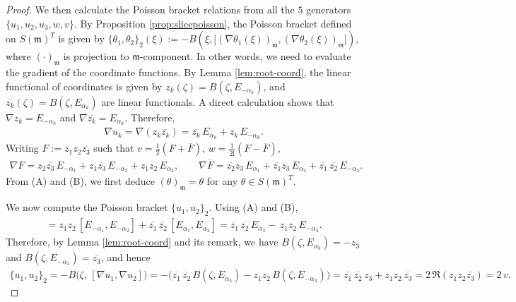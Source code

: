 \documentclass[11pt]{amsart}
\theoremstyle{definition}
\theoremstyle{plain}
\theoremstyle{conclusion}
\begin{document}
\begin{proof}
 
   We then calculate the Poisson bracket relations from all the $5$ generators $\{u_1,u_2,u_3,w,v\}$. By Proposition \ref{prop:slicepoisson}, the Poisson bracket defined on $S(\mathfrak{m})^T$ is given by $\{\theta_1,\theta_2\}_2(\xi) :=-B \left(\xi,\bigl[(\nabla\theta_1(\xi))_{\mathfrak{m}},(\nabla\theta_2(\xi))_{\mathfrak{m}}\bigr]\right)$, where $(\cdot)_\mathfrak{m}$ is projection to $\mathfrak{m}$-component. In other words, we need to evaluate the gradient of the coordinate functions. By Lemma \ref{lem:root-coord}, the linear functional of coordinates is given by $z_k(\zeta)=B(\zeta,E_{-\alpha_k})$, and $\overline{z_k}(\zeta)=B(\zeta,E_{\alpha_k})$ are linear functionals. A direct calculation shows that  $\nabla z_k=E_{-\alpha_k}$ and $\nabla \overline{z_k}=E_{\alpha_k}$. Therefore, \begin{align}
\nabla u_k=\nabla(z_k\overline{z_k})=\overline{z_k}\,E_{\alpha_k}+z_k\,E_{-\alpha_k}.\tag{A}
\end{align} Writing $F:=z_1z_2\overline{z_3}$ such that $v=\frac{1}{2}(F+\overline{F})$, $w=\frac{1}{2\mathrm{i}}(F-\overline{F})$, \begin{align}
\nabla F=z_2\overline{z_3}\,E_{-\alpha_1}+z_1\overline{z_3}\,E_{-\alpha_2}+z_1z_2\,E_{\alpha_3},\qquad \nabla\overline{F}=\overline{z_2}z_3\,E_{\alpha_1}+\overline{z_1}z_3\,E_{\alpha_2}+\overline{z_1}\,\overline{z_2}\,E_{-\alpha_3}.\tag{B}
\end{align} From (A) and (B), we first deduce $(\theta)_\mathfrak{m} =\theta$ for any $\theta \in S(\mathfrak{m})^T$.

We now compute the Poisson bracket $\{u_1,u_2\}_2$.  Using (A) and (B), \begin{align*}
[\nabla u_1,\nabla u_2] = z_1z_2\,[E_{-\alpha_1},E_{-\alpha_2}]+\overline{z_1}\,\overline{z_2}\,[E_{\alpha_1},E_{\alpha_2}] =  \overline{z_1}\,\overline{z_2}\,E_{\alpha_3}-\,z_1z_2\,E_{-\alpha_3}.
\end{align*} Therefore, by Lemma \ref{lem:root-coord} and its remark, we have $B(\zeta,E_{\alpha_3}) = -z_3$ and $B(\zeta,E_{-\alpha_3}) = \overline{z_3}$, and hence \begin{align*}
\{u_1,u_2\}_2 =-B\big(\zeta,\,[\nabla u_1,\nabla u_2]\big) = -\Big( \overline{z_1}\,\overline{z_2}\,B(\zeta,E_{\alpha_3}) -z_1z_2\,B(\zeta,E_{-\alpha_3})\Big) = \overline{z_1}\,\overline{z_2}\,z_3 +z_1z_2\,\overline{z_3} = 2\,\Re(z_1z_2\overline{z_3}) = 2\,v.
\end{align*}


\end{proof}
\end{document}
